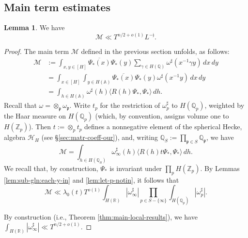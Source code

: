 \documentclass[reqno]{amsart}
\theoremstyle{plain} \newtheorem{theorem} {Theorem}
\theoremstyle{definition} \newtheorem{definition} [theorem] {Definition}
\theoremstyle{itplain} %
\newtheorem{lemma}[theorem]{Lemma}
\numberwithin{equation}{section}
\numberwithin{theorem}{section}
\begin{document}
\subsection{Main term estimates}\label{sec:main-term-estimates}
\begin{lemma}\label{lem:sub-gln:main-term-estimates}
  We have
  \begin{equation*}
    \mathcal{M} \ll T^{n/2 + o(1)} L^{-\mathfrak{j}}.
  \end{equation*}
\end{lemma}
\begin{proof}
The main term $\mathcal{M}$ defined in the previous section unfolds, as follows:
\begin{align*}
  \mathcal{M}
  &:= \int _{x, y \in [H]} \overline{\Psi_{\ast}(x)} \Psi_{\ast}(y)
    \sum _{\gamma \in H(\mathbb{Q})} \omega^\sharp(x^{-1} \gamma y) \, d x \, d y \\
  &= \int _{x \in [H]} \int _{y \in H(\mathbb{A})}\overline{\Psi_{\ast}(x)} \Psi_{\ast}(y)  \omega^\sharp(x^{-1} y) \, d x \, d y \\
  &= \int _{h \in H(\mathbb{A})}  \omega^\sharp(h) \langle R(h) \Psi_{\ast}, \Psi_{\ast} \rangle \, d h.
\end{align*}
Recall that $\omega = \otimes_{\mathfrak{p}} \omega_\mathfrak{p}$.  Write $t_p$ for the restriction of $\omega_p^\sharp$ to $H(\mathbb{Q}_p)$, weighted by the Haar measure on $H(\mathbb{Q}_p)$ (which, by convention, assigns volume one to $H(\mathbb{Z}_p)$).  Then $t := \otimes_p t_p$ defines a nonnegative element of the spherical Hecke, algebra $\mathcal{H}_H$ (see \S\ref{sec:matr-coeff-our}), and, writing $\mathbb{Q}_S := \prod_{\mathfrak{p} \in S} \mathbb{Q}_\mathfrak{p}$, we have
\begin{equation*}
  \mathcal{M} = \int _{h \in H(\mathbb{Q}_S) } \omega_\infty^\sharp(h) \langle R(h) t \Psi_{\ast}, \Psi_{\ast} \rangle \, d h.
\end{equation*}
We recall that, by construction, $\Psi_{\ast}$ is invariant under $\prod_p H(\mathbb{Z}_p)$.  By Lemmas \ref{lem:sub-gln:each-y-in} and \ref{lem:let-p-notin}, it follows that
\begin{equation*}
  \mathcal{M} \ll \lambda_0(t) T^{o(1)} \int_{H(\mathbb{R})} |\omega_\infty^\sharp|
  \prod_{p \in S - \{\infty\}}
  \int _{H(\mathbb{Q}_p)} |\omega_p ^\sharp|.
\end{equation*}

By construction (i.e., Theorem \ref{thm:main-local-results}), we have $\int_{H(\mathbb{R})} |\omega_\infty^\sharp| \ll T^{n/2+o(1)}$.


\end{proof}
\end{document}
